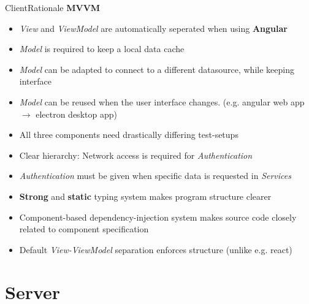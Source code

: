 \documentclass{sdqbeamer}[en]
\begin{document}
\begin{frame}{Client}{Rationale}
        \textbf{MVVM}
        \begin{itemize}
            \item \textit{View} and \textit{ViewModel} are automatically seperated when using \textbf{Angular}
            \item \textit{Model} is required to keep a local data cache
            \item \textit{Model} can be adapted to connect to a different datasource, while keeping interface
            \item \textit{Model} can be reused when the user interface changes. (e.g. angular web app $\rightarrow$ electron desktop app)
            \item All three components need drastically differing test-setups
        \end{itemize}
        
        \vspace{0.5em}
        
        \begin{itemize}
            \item<2-> Clear hierarchy: Network access is required for \textit{Authentication}
            \item<2-> \textit{Authentication} must be given when specific data is requested in \textit{Services}
        \end{itemize}

        \vspace{0.5em}

        \begin{itemize}
            \item<3-> \textbf{Strong} and \textbf{static} typing system makes program structure clearer
            \item<3-> Component-based dependency-injection system makes source code closely related to component specification
            \item<3-> Default \textit{View-ViewModel} separation enforces structure (unlike e.g. react) 
        \end{itemize}
\end{frame}

\section{Server}
\end{document}
